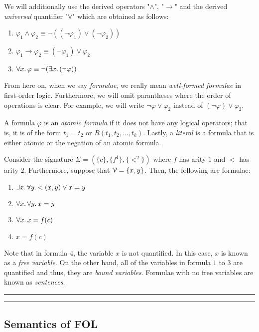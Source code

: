 \documentclass[11pt,usenames, dvipsnames]{article}
\begin{document}
We will additionally use the derived operators "$\wedge$", "$\rightarrow$" and the derived \emph{universal} quantifier "$\forall$" which are obtained as follows:
\begin{enumerate}
  \item $\varphi_1 \wedge \varphi_2 \equiv \neg((\neg \varphi_1) \vee (\neg \varphi_2))$
  \item $\varphi_1 \rightarrow \varphi_2 \equiv (\neg \varphi_1) \vee \varphi_2$
  \item $\forall x \ldotp \varphi \equiv \neg(\exists x \ldotp (\neg \varphi))$
\end{enumerate}

From here on, when we say \emph{formulae}, we really mean \emph{well-formed formulae} in first-order logic. Furthermore, we will omit parantheses where the order of operations is clear. For example, we will write $\neg \varphi \vee \varphi_2$ instead of $(\neg \varphi) \vee \varphi_2$.

A formula $\varphi$ is an \emph{atomic formula} if it does not have any logical operators; that is, it is of the form $t_1 = t_2$ or $R(t_1, t_2, \ldots, t_k)$. Lastly, a \emph{literal} is a formula that is either atomic or the negation of an atomic formula.

\begin{example}
  Consider the signature $\Sigma = (\{c\}, \{f^1\}, \{<^2\})$ where $f$ has arity $1$ and $<$ has arity $2$. Furthermore, suppose that $\vars = \{x, y\}$. Then, the following are formulae:
  \begin{enumerate}
    \item $\exists x \ldotp \forall y \ldotp <(x, y) \vee x = y$
    \item $\forall x \ldotp \forall y \ldotp x = y$
    \item $\forall x \ldotp x = f(c)$
    \item $x = f(c)$
  \end{enumerate}
\end{example}

Note that in formula $4$, the variable $x$ is not quantified. In this case, $x$ is known as a \emph{free variable}. On the other hand, all of the variables in formula $1$ to $3$ are quantified and thus, they are \emph{bound variables}. Formulae with no free variables are known as \emph{sentences}.

\vspace{5truemm}
\hrule
\hrule

\subsection{\large \centering Semantics of FOL}
\noindent
\end{document}
